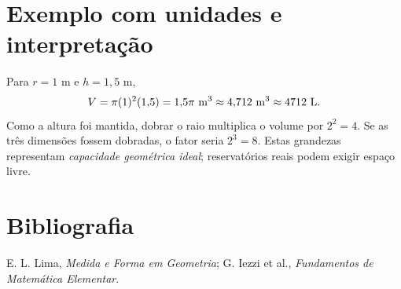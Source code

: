\documentclass[11pt,a4paper]{article}
\begin{document}
\section{Exemplo com unidades e interpretação}
Para $r=1$ m e $h=1{,}5$ m,
\[
V=\pi(1)^2(1{,}5)=1{,}5\pi\ {\rm m}^3\approx4{,}712\ {\rm m}^3\approx4712\ {\rm L}.
\]
Como a altura foi mantida, dobrar o raio multiplica o volume por $2^2=4$. Se as três dimensões fossem dobradas, o fator seria $2^3=8$. Estas grandezas representam \emph{capacidade geométrica ideal}; reservatórios reais podem exigir espaço livre.
\section{Bibliografia}
E. L. Lima, \emph{Medida e Forma em Geometria}; G. Iezzi et al., \emph{Fundamentos de Matemática Elementar}.
\end{document}
